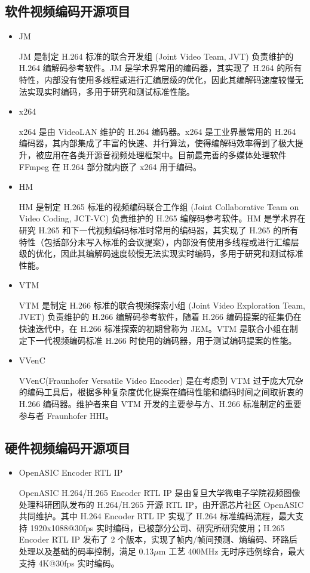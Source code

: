 \subsection{软件视频编码开源项目}
\begin{itemize}
    \item JM

          JM 是制定 H.264 标准的联合开发组 (Joint Video Team, JVT) 负责维护的 H.264 编解码参考软件。JM 是学术界常用的编码器，其实现了 H.264 的所有特性，内部没有使用多线程或进行汇编层级的优化，因此其编解码速度较慢无法实现实时编码，多用于研究和测试标准性能。

    \item x264

          x264 是由 VideoLAN 维护的 H.264 编码器。x264 是工业界最常用的 H.264 编码器，其内部集成了丰富的快速、并行算法，使得编解码效率得到了极大提升，被应用在各类开源音视频处理框架中。目前最完善的多媒体处理软件 FFmpeg 在 H.264 部分就内嵌了 x264 用于编码。

    \item HM

          HM 是制定 H.265 标准的视频编码联合工作组 (Joint Collaborative Team on Video Coding, JCT-VC) 负责维护的 H.265 编解码参考软件。HM 是学术界在研究 H.265 和下一代视频编码标准时常用的编码器，其实现了 H.265 的所有特性（包括部分未写入标准的会议提案），内部没有使用多线程或进行汇编层级的优化，因此其编解码速度较慢无法实现实时编码，多用于研究和测试标准性能。

    \item VTM

          VTM 是制定 H.266 标准的联合视频探索小组 (Joint Video Exploration Team, JVET) 负责维护的 H.266 编解码参考软件，随着 H.266 编码提案的征集仍在快速迭代中，在 H.266 标准探索的初期曾称为 JEM。VTM 是联合小组在制定下一代视频编码标准 H.266 时使用的编码器，用于测试编码提案的性能。

    \item VVenC

          VVenC(Fraunhofer Versatile Video Encoder) 是在考虑到 VTM 过于庞大冗杂的编码工具后，根据多种复杂度优化提案在编码性能和编码时间之间取折衷的 H.266 编码器。维护者来自 VTM 开发的主要参与方、H.266 标准制定的重要参与者 Fraunhofer HHI。
\end{itemize}

\subsection{硬件视频编码开源项目}
\begin{itemize}
    \item OpenASIC Encoder RTL IP

          OpenASIC H.264/H.265 Encoder RTL IP 是由复旦大学微电子学院视频图像处理科研团队发布的 H.264/H.265 开源 RTL IP，由开源芯片社区 OpenASIC 共同维护。其中 H.264 Encoder RTL IP 实现了 H.264 标准编码流程，最大支持 1920x1088@30fps 实时编码，已被部分公司、研究所研究使用；H.265 Encoder RTL IP 发布了 2 个版本，实现了帧内/帧间预测、熵编码、环路后处理以及基础的码率控制，满足 0.13$\mu$m 工艺 400MHz 无时序违例综合，最大支持 4K@30fps 实时编码。
\end{itemize}

